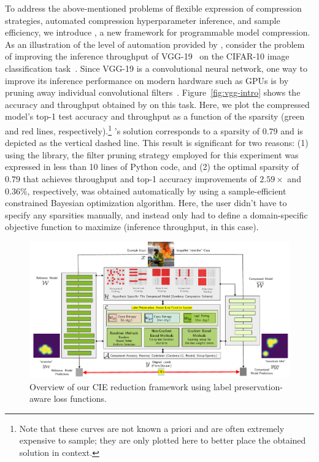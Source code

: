 To address the above-mentioned problems of flexible expression of compression strategies, automated compression hyperparameter inference, and sample efficiency, we introduce \algoName, a new framework for programmable model compression. As an illustration of the level of automation provided by \algoName,
consider the problem of improving the
inference throughput of VGG-19~\cite{simonyan2014very} on the CIFAR-10 image
classification task~\cite{krizhevsky2014cifar}.
%
Since VGG-19 is a convolutional neural network, one way to improve its
inference performance on modern hardware such as GPUs is by pruning
away individual convolutional filters~\cite{he2018progressive}.
%
Figure~\ref{fig:vgg-intro} shows the accuracy and throughput obtained
by \algoName on this task.
%
Here, we plot the compressed model's top-1 test accuracy and throughput as a function of the sparsity (green and red lines,
respectively).\footnote{Note that these curves are not known a priori and
are often extremely expensive to sample;
they are only plotted here to better place the obtained solution in context.}
%
\algoName's solution corresponds to a sparsity of $0.79$
and is depicted as the vertical dashed line.
%
This result is significant for two reasons: (1) using the \algoName library,
the filter pruning strategy employed for this experiment was expressed in
less than 10 lines of Python code, and (2) the optimal sparsity of
$0.79$ that
achieves throughput and top-1 accuracy improvements of $2.59\times$ and $0.36\%$, respectively,
was obtained automatically by \algoName using a sample-efficient constrained
Bayesian optimization algorithm.
%
Here, the user didn't have to specify any
sparsities manually, and instead only had to define a domain-specific
objective function to maximize (inference throughput, in this case).

\begin{figure}[!t]
\centering
  \includegraphics[width=\textwidth]{img/FinalIntroFigure.pdf}
  \caption{Overview of our CIE reduction framework using label preservation-aware loss functions.}
  \label{fig:overview}
\end{figure}

